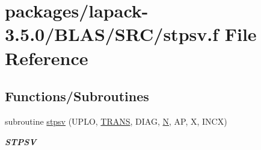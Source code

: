 \hypertarget{lapack-3_85_80_2BLAS_2SRC_2stpsv_8f}{}\section{packages/lapack-\/3.5.0/\+B\+L\+A\+S/\+S\+R\+C/stpsv.f File Reference}
\label{lapack-3_85_80_2BLAS_2SRC_2stpsv_8f}
\subsection*{Functions/\+Subroutines}
\begin{DoxyCompactItemize}
\item 
subroutine \hyperlink{group__single__blas__level2_gae6fb0355e398779dc593ced105ce373d}{stpsv} (U\+P\+L\+O, \hyperlink{superlu__enum__consts_8h_a0c4e17b2d5cea33f9991ccc6a6678d62a1f61e3015bfe0f0c2c3fda4c5a0cdf58}{T\+R\+A\+N\+S}, D\+I\+A\+G, \hyperlink{polmisc_8c_a0240ac851181b84ac374872dc5434ee4}{N}, A\+P, X, I\+N\+C\+X)
\begin{DoxyCompactList}\small\item\em {\bfseries S\+T\+P\+S\+V} \end{DoxyCompactList}\end{DoxyCompactItemize}
